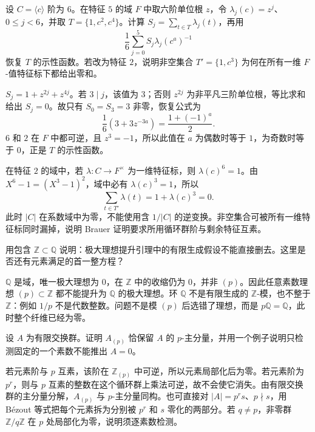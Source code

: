 \begin{exercise}\label{b5:ex:05-fourier-choice}
	设 \(C=\langle c\rangle\) 阶为 \(6\)。在特征 \(5\) 的域 \(F\) 中取六阶单位根 \(z\)，令 \(\lambda_j(c)=z^j\)、\(0\le j<6\)，并取 \(T=\{1,c^2,c^4\}\)。计算 \(S_j=\sum_{t\in T}\lambda_j(t)\)，再用
	\[
		\frac16\sum_{j=0}^5S_j\lambda_j(c^a)^{-1}
	\]
	恢复 \(T\) 的示性函数。若改为特征 \(2\)，说明非空集合 \(T'=\{1,c^3\}\) 为何在所有一维 \(F\)-值特征标下都给出零和。
\end{exercise}
\begin{solution}
	\(S_j=1+z^{2j}+z^{4j}\)。若 \(3\mid j\)，该值为 \(3\)；否则 \(z^{2j}\) 为非平凡三阶单位根，等比求和给出 \(S_j=0\)。故只有 \(S_0=S_3=3\) 非零，恢复公式为
	\[
		\frac16(3+3z^{-3a})=\frac{1+(-1)^a}{2}.
	\]
	\(6\) 和 \(2\) 在 \(F\) 中都可逆，且 \(z^3=-1\)，所以此值在 \(a\) 为偶数时等于 \(1\)，为奇数时等于 \(0\)，正是 \(T\) 的示性函数。

	在特征 \(2\) 的域中，若 \(\lambda:C\rightarrow F^\times\) 为一维特征标，则 \(\lambda(c)^6=1\)。由 \(X^6-1=(X^3-1)^2\)，域中必有 \(\lambda(c)^3=1\)，所以
	\[
		\sum_{t\in T'}\lambda(t)=1+\lambda(c)^3=0.
	\]
	此时 \(|C|\) 在系数域中为零，不能使用含 \(1/|C|\) 的逆变换。非空集合可被所有一维特征标同时漏掉，说明 Brauer 证明要求所用循环群阶与剩余特征互素。
\end{solution}

\begin{exercise}\label{b5:ex:05-finiteness-lifting}
	用包含 \(\mathbb Z\subset\mathbb Q\) 说明：极大理想提升引理中的有限生成假设不能直接删去。这里是否还有元素满足的首一整方程？
\end{exercise}
\begin{solution}
	\(\mathbb Q\) 是域，唯一极大理想为 \(0\)，在 \(\mathbb Z\) 中的收缩仍为 \(0\)，并非 \((p)\)。因此任意素数理想 \((p)\subset\mathbb Z\) 都不能提升为 \(\mathbb Q\) 的极大理想。环 \(\mathbb Q\) 不是有限生成的 \(\mathbb Z\)-模，也不整于 \(\mathbb Z\)：例如 \(1/p\) 不是代数整数。问题不是模 \((p)\) 后选错了理想，而是 \(p\mathbb Q=\mathbb Q\)，此时整个纤维已经为零。
\end{solution}

\begin{exercise}\label{b5:ex:05-local-detection-primes}
	设 \(A\) 为有限交换群。证明 \(A_{(p)}\) 恰保留 \(A\) 的 \(p\)-主分量，并用一个例子说明只检测固定的一个素数不能推出 \(A=0\)。
\end{exercise}
\begin{solution}
	若元素阶与 \(p\) 互素，该阶在 \(\mathbb Z_{(p)}\) 中可逆，所以元素局部化后为零。若元素阶为 \(p^r\)，则与 \(p\) 互素的整数在这个循环群上乘法可逆，故不会使它消失。由有限交换群的主分量分解，\(A_{(p)}\) 与 \(p\)-主分量同构。也可直接对 \(|A|=p^r s\)、\(p\nmid s\)，用 Bézout 等式把每个元素拆为分别被 \(p^r\) 和 \(s\) 零化的两部分。若 \(q\ne p\)，非零群 \(\mathbb Z/q\mathbb Z\) 在 \(p\) 处局部化为零，说明须逐素数检测。
\end{solution}


